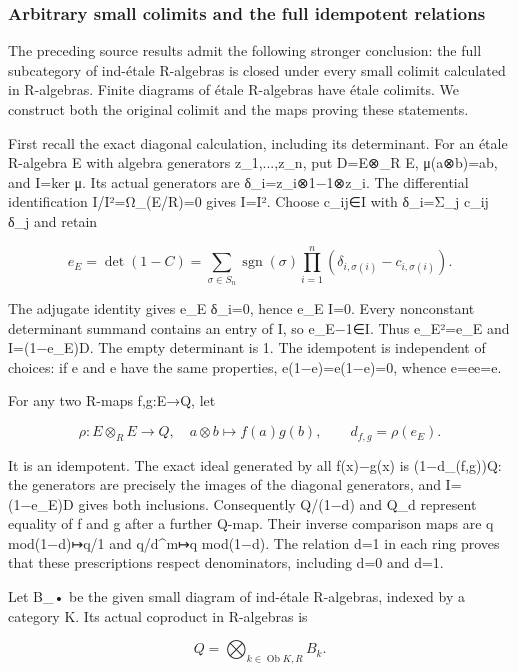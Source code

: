 \subsubsection{Arbitrary small colimits and the full idempotent relations}\label{algebra-proof-059-arbitrary-small-colimits-and-the-full-idempotent-relations}

The preceding source results admit the following stronger conclusion: the full subcategory of ind-étale R-algebras is closed under every small colimit calculated in R-algebras. Finite diagrams of étale R-algebras have étale colimits. We construct both the original colimit and the maps proving these statements.

First recall the exact diagonal calculation, including its determinant. For an étale R-algebra E with algebra generators z\_1,...,z\_n, put D=E⊗\_R E, μ(a⊗b)=ab, and I=ker μ. Its actual generators are δ\_i=z\_i⊗1−1⊗z\_i. The differential identification I/I²=Ω\_(E/R)=0 gives I=I². Choose c\_ij∈I with δ\_i=Σ\_j c\_ij δ\_j and retain

\[
e_E=\det(1-C)
 =\sum_{\sigma\in S_n}\operatorname{sgn}(\sigma)
   \prod_{i=1}^n(\delta_{i,\sigma(i)}-c_{i,\sigma(i)}).
\]

The adjugate identity gives e\_E δ\_i=0, hence e\_E I=0. Every nonconstant determinant summand contains an entry of I, so e\_E−1∈I. Thus e\_E²=e\_E and I=(1−e\_E)D. The empty determinant is 1. The idempotent is independent of choices: if e and e\textquotesingle{} have the same properties, e(1−e\textquotesingle)=e\textquotesingle(1−e)=0, whence e=ee\textquotesingle=e\textquotesingle.

For any two R-maps f,g:E→Q, let

\[
\rho:E\otimes_RE\to Q,\quad a\otimes b\mapsto f(a)g(b),
\qquad d_{f,g}=\rho(e_E).
\]

It is an idempotent. The exact ideal generated by all f(x)−g(x) is (1−d\_(f,g))Q: the generators are precisely the images of the diagonal generators, and I=(1−e\_E)D gives both inclusions. Consequently Q/(1−d) and Q\_d represent equality of f and g after a further Q-map. Their inverse comparison maps are q mod(1−d)↦q/1 and q/d\^{}m↦q mod(1−d). The relation d=1 in each ring proves that these prescriptions respect denominators, including d=0 and d=1.

Let B\_• be the given small diagram of ind-étale R-algebras, indexed by a category K. Its actual coproduct in R-algebras is

\[
Q=\bigotimes_{k\in\operatorname{Ob}K,R} B_k.
\]

